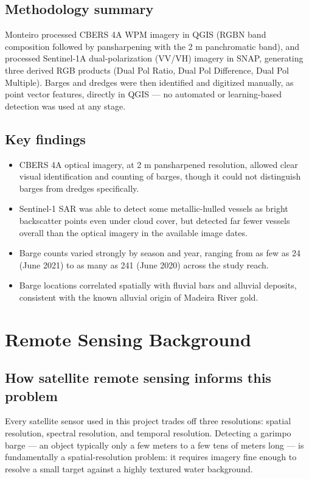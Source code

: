 \documentclass[11pt,a4paper]{article}
\begin{document}
\subsection{Methodology summary}
Monteiro processed CBERS 4A WPM imagery in QGIS (RGBN band composition
followed by pansharpening with the 2 m panchromatic band), and processed
Sentinel-1A dual-polarization (VV/VH) imagery in SNAP, generating three
derived RGB products (Dual Pol Ratio, Dual Pol Difference, Dual Pol
Multiple). Barges and dredges were then identified and digitized manually,
as point vector features, directly in QGIS --- no automated or
learning-based detection was used at any stage.

\subsection{Key findings}
\begin{itemize}[nosep]
  \item CBERS 4A optical imagery, at 2 m pansharpened resolution, allowed
        clear visual identification and counting of barges, though it could
        not distinguish barges from dredges specifically.
  \item Sentinel-1 SAR was able to detect some metallic-hulled vessels as
        bright backscatter points even under cloud cover, but detected far
        fewer vessels overall than the optical imagery in the available
        image dates.
  \item Barge counts varied strongly by season and year, ranging from as few
        as 24 (June 2021) to as many as 241 (June 2020) across the study
        reach.
  \item Barge locations correlated spatially with fluvial bars and alluvial
        deposits, consistent with the known alluvial origin of Madeira River
        gold.
\end{itemize}

\section{Remote Sensing Background}

\subsection{How satellite remote sensing informs this problem}
Every satellite sensor used in this project trades off three resolutions:
spatial resolution, spectral resolution, and temporal resolution. Detecting a
garimpo barge --- an object typically only a few meters to a few tens of
meters long --- is fundamentally a spatial-resolution problem: it requires
imagery fine enough to resolve a small target against a highly textured water
background.
\end{document}
